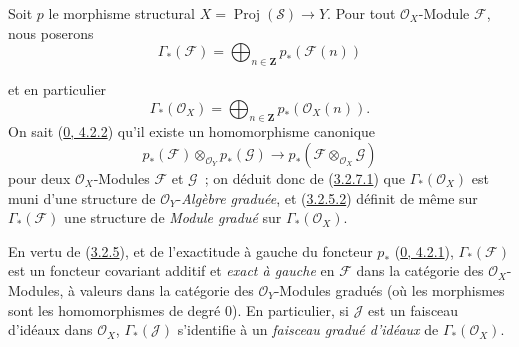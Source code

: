 \begin{env}[3.3.1]
\label{II.3.3.1-fr}
Soit $p$ le morphisme structural $X=\operatorname{Proj}(\mathcal{S})\to Y$.
Pour tout $\mathcal{O}_X$-Module $\mathcal{F}$, nous poserons
\[
\label{II.3.3.1.1-fr}
  \Gamma_*(\mathcal{F})
  =\bigoplus_{n\in\mathbf{Z}}p_*(\mathcal{F}(n))
\tag{3.3.1.1}
\]


et en particulier
\[
\label{II.3.3.1.2-fr}
  \Gamma_*(\mathcal{O}_X)
  =\bigoplus_{n\in\mathbf{Z}}p_*(\mathcal{O}_X(n)).
\tag{3.3.1.2}
\]
On sait (\hyperref[0.4.2.2-fr]{0, 4.2.2}) qu'il existe un homomorphisme
canonique
\[
  p_*(\mathcal{F})\otimes_{\mathcal{O}_Y}p_*(\mathcal{G})
  \longrightarrow
  p_*(\mathcal{F}\otimes_{\mathcal{O}_X}\mathcal{G})
\]
pour deux $\mathcal{O}_X$-Modules $\mathcal{F}$ et $\mathcal{G}$~; on déduit
donc de (\hyperref[II.3.2.7.1-fr]{3.2.7.1}) que
$\Gamma_*(\mathcal{O}_X)$ est muni d'une structure de
$\mathcal{O}_Y$-\emph{Algèbre graduée}, et
(\hyperref[II.3.2.5.2-fr]{3.2.5.2}) définit de même sur
$\Gamma_*(\mathcal{F})$ une structure de \emph{Module gradué} sur
$\Gamma_*(\mathcal{O}_X)$.

En vertu de (\hyperref[II.3.2.5-fr]{3.2.5}), et de l'exactitude à gauche du
foncteur $p_*$ (\hyperref[0.4.2.1-fr]{0, 4.2.1}),
$\Gamma_*(\mathcal{F})$ est un foncteur covariant additif et
\emph{exact à gauche} en $\mathcal{F}$ dans la catégorie des
$\mathcal{O}_X$-Modules, à valeurs dans la catégorie des
$\mathcal{O}_Y$-Modules gradués (où les morphismes sont les homomorphismes de
degré $0$). En particulier, si $\mathcal{J}$ est un faisceau d'idéaux dans
$\mathcal{O}_X$, $\Gamma_*(\mathcal{J})$ s'identifie à un
\emph{faisceau gradué d'idéaux} de $\Gamma_*(\mathcal{O}_X)$.
\end{env}

